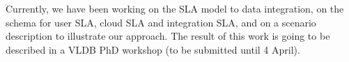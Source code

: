\documentclass[11pt,a4paper,oneside]{report}
\begin{document}

Currently, we have been working on the SLA model to data integration, on the schema for user SLA, cloud SLA and integration SLA, and on a scenario description to illustrate our approach.  The result of this work is going to be described in a VLDB PhD workshop (to be submitted until 4 April).

\end{document}
